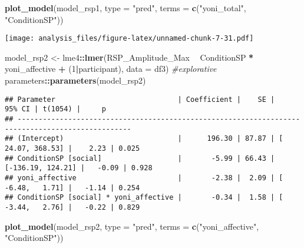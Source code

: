 \documentclass[
]{article}
\newenvironment{Shaded}{\begin{snugshade}}{\end{snugshade}}
\newcommand{\CommentTok}[1]{\textcolor[rgb]{0.56,0.35,0.01}{\textit{#1}}}
\newcommand{\DataTypeTok}[1]{\textcolor[rgb]{0.13,0.29,0.53}{#1}}
\newcommand{\DecValTok}[1]{\textcolor[rgb]{0.00,0.00,0.81}{#1}}
\newcommand{\KeywordTok}[1]{\textcolor[rgb]{0.13,0.29,0.53}{\textbf{#1}}}
\newcommand{\NormalTok}[1]{#1}
\newcommand{\OperatorTok}[1]{\textcolor[rgb]{0.81,0.36,0.00}{\textbf{#1}}}
\newcommand{\StringTok}[1]{\textcolor[rgb]{0.31,0.60,0.02}{#1}}
\begin{document}
\begin{Shaded}
\begin{Highlighting}[]
\KeywordTok{plot_model}\NormalTok{(model_rsp1, }\DataTypeTok{type =} \StringTok{"pred"}\NormalTok{, }\DataTypeTok{terms =} \KeywordTok{c}\NormalTok{(}\StringTok{"yoni_total"}\NormalTok{, }\StringTok{"ConditionSP"}\NormalTok{))}
\end{Highlighting}
\end{Shaded}

\texttt{[image: analysis\_files/figure-latex/unnamed-chunk-7-31.pdf]}

\begin{Shaded}
\begin{Highlighting}[]
\NormalTok{model_rsp2 <-}\StringTok{ }\NormalTok{lme4}\OperatorTok{::}\KeywordTok{lmer}\NormalTok{(RSP_Amplitude_Max }\OperatorTok{~}\StringTok{ }\NormalTok{ConditionSP }\OperatorTok{*}\StringTok{ }\NormalTok{yoni_affective }\OperatorTok{+}\StringTok{ }\NormalTok{(}\DecValTok{1}\OperatorTok{|}\NormalTok{participant), }\DataTypeTok{data =}\NormalTok{ df3)  }\CommentTok{#explorative}
\NormalTok{parameters}\OperatorTok{::}\KeywordTok{parameters}\NormalTok{(model_rsp2)}
\end{Highlighting}
\end{Shaded}

\begin{verbatim}
## Parameter                             | Coefficient |    SE |            95% CI | t(1054) |     p
## -------------------------------------------------------------------------------------------------
## (Intercept)                           |      196.30 | 87.87 | [  24.07, 368.53] |    2.23 | 0.025
## ConditionSP [social]                  |       -5.99 | 66.43 | [-136.19, 124.21] |   -0.09 | 0.928
## yoni_affective                        |       -2.38 |  2.09 | [  -6.48,   1.71] |   -1.14 | 0.254
## ConditionSP [social] * yoni_affective |       -0.34 |  1.58 | [  -3.44,   2.76] |   -0.22 | 0.829
\end{verbatim}

\begin{Shaded}
\begin{Highlighting}[]
\KeywordTok{plot_model}\NormalTok{(model_rsp2, }\DataTypeTok{type =} \StringTok{"pred"}\NormalTok{, }\DataTypeTok{terms =} \KeywordTok{c}\NormalTok{(}\StringTok{"yoni_affective"}\NormalTok{, }\StringTok{"ConditionSP"}\NormalTok{))}
\end{Highlighting}
\end{Shaded}
\end{document}
